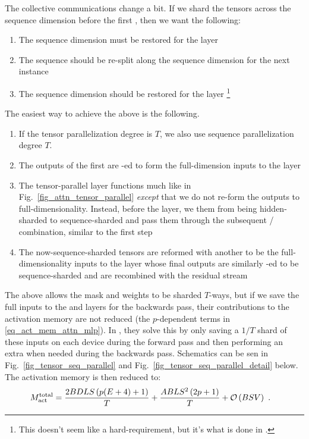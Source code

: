 \documentclass[11pt]{article}
\begin{document}
The collective communications change a bit. If we shard the tensors across the sequence dimension
before the first , then we want the following:
\begin{enumerate}
\item The sequence dimension must be restored for the  layer
\item The sequence should be re-split along the sequence dimension for the next  instance
\item The sequence dimension should be restored for the  layer \footnote{This doesn't
    seem like a hard-requirement, but it's what is done in \cite{korthikanti2022reducing}.}
\end{enumerate}

The easiest way to achieve the above is the following.
\begin{enumerate}
    \item If the tensor parallelization degree is $ T $, we also use sequence parallelization degree $ T
        $.
    \item The outputs of the first  are -ed to form the full-dimension
        inputs to the   layer
    \item The tensor-parallel  layer functions much like in
        Fig.~\ref{fig_attn_tensor_parallel} \textit{except} that we do not re-form the outputs to
        full-dimensionality.  Instead, before the  layer, we  them
        from being hidden-sharded to sequence-sharded and pass them through the subsequent
        / combination, similar to the first step
    \item The now-sequence-sharded tensors are reformed with another  to be the full-dimensionality inputs to the
         layer whose final outputs are similarly -ed to be
        sequence-sharded and are recombined with the residual stream
\end{enumerate}
The above allows the  mask and  weights to be sharded $ T
$-ways, but if we save the full inputs to the  and   layers
for the backwards pass, their contributions to the activation memory are not reduced (the $ p
$-dependent terms in \eqref{eq_act_mem_attn_mlp}). In \cite{korthikanti2022reducing}, they solve
this by only saving a $ 1/T $ shard of these inputs on each device during the forward pass and then
performing an extra  when needed during the backwards pass. Schematics can be
sen in Fig.~\ref{fig_tensor_seq_parallel} and Fig.~\ref{fig_tensor_seq_parallel_detail} below. The
activation memory is then reduced to:
\begin{align}
        M _{ {\rm act}  } ^{ {\rm  total}  } & =\frac{ 2BDLS   \left ( p(E+4) + 1   \right ) }{ T }
        + \frac{ ABLS ^{ 2 } \left ( 2p+1\right ) }{ T }  + \mathcal{O} \left( BSV \right) \label{eq_act_mem_total_seq_parallel}\ .
\end{align}
\end{document}
